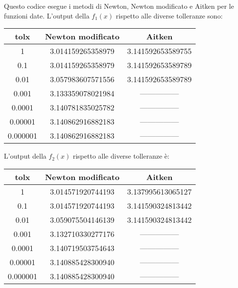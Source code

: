 
Questo codice esegue i metodi di Newton, Newton modificato e Aitken per le funzioni date.
\newpage
L'output della $f_{1}(x)$ rispetto alle diverse tolleranze sono:

\begin{center}
\begin{tabular}{c|c|c}
tolx & Newton modificato & Aitken \\
\hline
1 & 3.014159265358979 & 3.141592653589755 \\
0.1 & 3.014159265358979 & 3.141592653589789 \\
0.01 & 3.057983607571556 & 3.141592653589789 \\
0.001 & 3.133359078021984 & --------------- \\ 
0.0001 & 3.140781835025782 & --------------- \\
0.00001 & 3.140862916882183 & --------------- \\
0.000001 & 3.140862916882183 & --------------- \\
\end{tabular}
\end{center}

L'output della \(f_{2}(x)\) rispetto alle diverse tolleranze è: \newline

\begin{center}
\begin{tabular}{c|c|c}
tolx & Newton modificato & Aitken \\
\hline
1 & 3.014571920744193 & 3.137995613065127 \\
0.1 & 3.014571920744193 & 3.141590324813442 \\
0.01 & 3.059075504146139 & 3.141590324813442 \\
0.001 & 3.132710330277176 & --------------- \\ 
0.0001 & 3.140719503754643 & --------------- \\
0.00001 & 3.140885428300940 & --------------- \\
0.000001 & 3.140885428300940 & --------------- \\
\end{tabular} \\
\end{center}